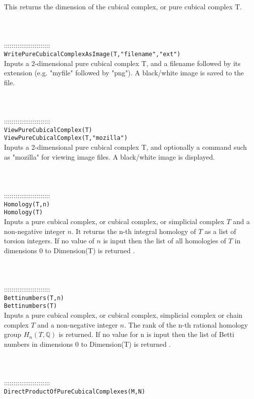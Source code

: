 \documentclass[a4paper,11pt]{report}
\begin{document}
{ This returns the dimension of the cubical complex, or pure cubical complex T. \\
 \\
 \\
 \\
 ::::::::::::::::::::::::\\
 \texttt{WritePureCubicalComplexAsImage(T,"filename","ext")}\\
 

 Inputs a 2-dimensional pure cubical complex T, and a filename followed by its
extension (e.g. "myfile" followed by "png"). A black/white image is saved to
the file. \\
 \\
 \\
 \\
 ::::::::::::::::::::::::\\
 \texttt{ViewPureCubicalComplex(T)}\\
 \texttt{ViewPureCubicalComplex(T,"mozilla")}\\
 

 Inputs a 2-dimensional pure cubical complex T, and optionally a command such
as "mozilla" for viewing image files. A black/white image is displayed. \\
 \\
 \\
 \\
 ::::::::::::::::::::::::\\
 \texttt{Homology(T,n)}\\
 \texttt{Homology(T)}\\
 

 Inputs a pure cubical complex, or cubical complex, or simplicial complex $T$ and a non-negative integer $n$. It returns the n-th integral homology of $T$ as a list of torsion integers. If no value of $n$ is input then the list of all homologies of $T$ in dimensions 0 to Dimension(T) is returned . \\
 \\
 \\
 \\
 ::::::::::::::::::::::::\\
 \texttt{Bettinumbers(T,n)}\\
 \texttt{Bettinumbers(T)}\\
 

 Inputs a pure cubical complex, or cubical complex, simplicial complex or chain
complex $T$ and a non-negative integer $n$. The rank of the n-th rational homology group $H_n(T,\mathbb Q)$ is returned. If no value for n is input then the list of Betti numbers in
dimensions 0 to Dimension(T) is returned . \\
 \\
 \\
 \\
 ::::::::::::::::::::::::\\
 \texttt{DirectProductOfPureCubicalComplexes(M,N)}\\
 

}
\end{document}
